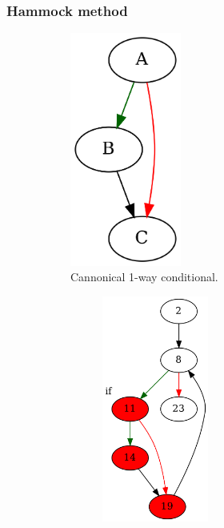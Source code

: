 \documentclass[aspectratio=1610]{beamer}
\begin{document}
\begin{frame}
	\frametitle{Hammock method}


	\begin{figure}[htbp]
		\centering
		\begin{subfigure}[b]{0.20\textwidth}
			\centering
			
			\includegraphics[width=0.4\textwidth]{inc/methods/hammock/if.png}
			\caption{Cannonical 1-way conditional.}
		\end{subfigure}
		\quad
		\begin{subfigure}[b]{0.65\textwidth}
			\centering
			\begin{subfigure}[ht]{0.40\textwidth}
				\centering
				\includegraphics[width=0.5\textwidth]{inc/methods/hammock/main_0002a.png}

\end{subfigure}
\end{subfigure}
\end{figure}
\end{frame}
\end{document}
